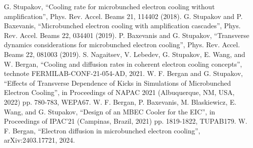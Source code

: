 \documentclass[letterpaper,11pt]{article}
\begin{document}
\begin{thebibliography}{9}   %
		G. Stupakov, ``Cooling rate for microbunched electron cooling without amplification'', Phys. Rev. Accel. Beams 21, 114402 (2018).
		G. Stupakov and P. Baxevanis, ``Microbunched electron cooling with amplification cascades'', Phys. Rev. Accel. Beams 22, 034401 (2019).
		P. Baxevanis and G. Stupakov, ``Transverse dynamics considerations for microbunched electron cooling'', Phys. Rev. Accel. Beams 22, 081003 (2019).
		 S. Nagaitsev, V. Lebedev, G. Stupakov, E. Wang, and W. Bergan, ``Cooling and diffusion rates in coherent electron  cooling concepts'', technote FERMILAB-CONF-21-054-AD, 2021.
                W. F. Bergan and G. Stupakov, ``Effects of Transverse Dependence of Kicks in Simulations of Microbunched Electron Cooling'', in Proceedings of NAPAC 2021 (Albuquerque, NM, USA, 2022) pp. 780-783, WEPA67.
                W. F. Bergan, P. Baxevanis, M. Blaskiewicz, E. Wang, and G. Stupakov, ``Design of an MBEC Cooler for the EIC'', in Proceedings of IPAC'21 (Campinas, Brazil, 2021) pp. 1819-1822, TUPAB179.
		W. F. Bergan, ``Electron diffusion in microbunched electron cooling'', arXiv:2403.17721, 2024.


\end{thebibliography}
\end{document}
